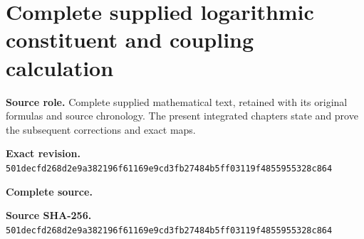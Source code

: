 \begingroup
\sloppy
\small
\clearpage
\section{Complete supplied logarithmic constituent and coupling calculation}
\noindent\textbf{Source role.} Complete supplied mathematical text, retained with its original formulas and source chronology. The present integrated chapters state and prove the subsequent corrections and exact maps.\par
\noindent\textbf{Exact revision.} \nolinkurl{501decfd268d2e9a382196f61169e9cd3fb27484b5ff03119f4855955328c864}\par
\noindent\textbf{Complete source.} \par
\noindent\textbf{Source SHA-256.} \nolinkurl{501decfd268d2e9a382196f61169e9cd3fb27484b5ff03119f4855955328c864}\par\medskip

\endgroup
